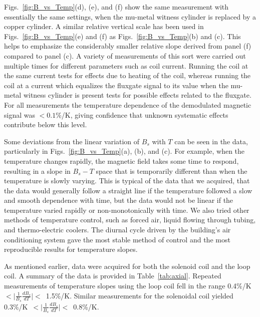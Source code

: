 Figs.~\ref{fig:B_vs_Temp}(d), (e), and (f) show the same measurement
with essentially the same settings, when the mu-metal witness cylinder
is replaced by a copper cylinder.  A similar relative vertical scale
has been used in Figs.~\ref{fig:B_vs_Temp}(e) and (f) as
Figs.~\ref{fig:B_vs_Temp}(b) and (c).  This helps to emphasize the
considerably smaller relative slope derived from panel (f) compared to
panel (c).  A variety of measurements of this sort were carried out
multiple times for different parameters such as coil current.  Running
the coil at the same current tests for effects due to heating of the
coil, whereas running the coil at a current which equalizes the
fluxgate signal to its value when the mu-metal witness cylinder is
present tests for possible effects related to the fluxgate.  For all
measurements the temperature dependence of the demodulated magnetic
signal was $<0.1$\%/K, giving confidence that unknown systematic
effects contribute below this level.

Some deviations from the linear variation of $B_s$ with $T$ can be
seen in the data, particularly in Figs.~\ref{fig:B_vs_Temp}(a), (b),
and (c).  For example, when the temperature changes rapidly, the
magnetic field takes some time to respond, resulting in a slope in
$B_s-T$ space that is temporarily different than when the temperature
is slowly varying.  This is typical of the data that we acquired, that
the data would generally follow a straight line if the temperature
followed a slow and smooth dependence with time, but the data would
not be linear if the temperature varied rapidly or non-monotonically
with time.  We also tried other methods of temperature control, such
as forced air, liquid flowing through tubing, and thermo-electric
coolers.  The diurnal cycle driven by the building's air conditioning
system gave the most stable method of control and the most
reproducible results for temperature slopes.

As mentioned earlier, data were acquired for both the solenoid coil
and the loop coil.  A summary of the data is provided in
Table~\ref{tab:axial}.  Repeated measurements of temperature slopes
using the loop coil fell in the range
0.4\%/K~$<\vert\frac{1}{B_s}\frac{dB_s}{dT}\vert<$~1.5\%/K.  Similar
measurements for the solenoidal coil yielded
0.3\%/K~$<\vert\frac{1}{B_s}\frac{dB_s}{dT}\vert<$~0.8\%/K.


